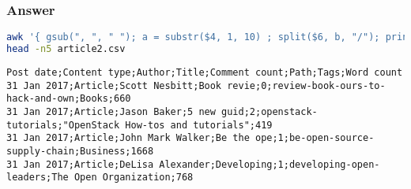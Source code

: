 \subsubsection*{Answer}
\begin{lstlisting}[language=bash]
awk '{ gsub(", ", " "); a = substr($4, 1, 10) ; split($6, b, "/"); print $1, $2, $3, a, $5, b[length(b)], $7, $8 }' FS="," OFS=";" jan2017articles.csv > article2.csv
head -n5 article2.csv
\end{lstlisting}

\begin{lstlisting}[style=output]
Post date;Content type;Author;Title;Comment count;Path;Tags;Word count
31 Jan 2017;Article;Scott Nesbitt;Book revie;0;review-book-ours-to-hack-and-own;Books;660
31 Jan 2017;Article;Jason Baker;5 new guid;2;openstack-tutorials;"OpenStack How-tos and tutorials";419
31 Jan 2017;Article;John Mark Walker;Be the ope;1;be-open-source-supply-chain;Business;1668
31 Jan 2017;Article;DeLisa Alexander;Developing;1;developing-open-leaders;The Open Organization;768
\end{lstlisting}
